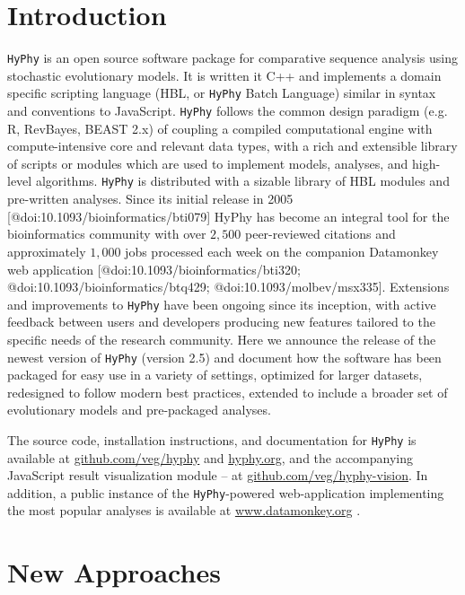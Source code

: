 \documentclass[nogrid]{MBE}%
\newcommand{\hyphy}{{\tt HyPhy}}
\begin{document}
\section{{Introduction}\label{sec:Intro}}

\hyphy{} is an open source software package for comparative sequence analysis
using stochastic evolutionary models. It is written it C++ and implements a
domain specific scripting language (HBL, or \hyphy{} Batch Language) similar in
syntax and conventions to JavaScript. \hyphy{} follows the common design
paradigm (e.g. R\cite{team2013r}, RevBayes\cite{hohna2016revbayes}, BEAST
2.x\cite{bouckaert2014beast}) of coupling a compiled computational engine with
compute-intensive core and relevant data types, with a rich and extensible
library of scripts or modules which are used to implement models, analyses, and
high-level algorithms. \hyphy{} is distributed with a sizable library of HBL
modules and pre-written analyses.  Since its initial release in 2005
[@doi:10.1093/bioinformatics/bti079] HyPhy has become an integral tool for the
bioinformatics community with over $2,500$ peer-reviewed citations and
approximately $1,000$ jobs processed each week on the companion Datamonkey web
application [@doi:10.1093/bioinformatics/bti320;
@doi:10.1093/bioinformatics/btq429; @doi:10.1093/molbev/msx335].  Extensions and
improvements to \hyphy{} have been ongoing since its inception, with active
feedback between users and developers producing new features tailored to the
specific needs of the research community. Here we announce the release of the
newest version of \hyphy{} (version 2.5) and document how the software has been
packaged for easy use in a variety of settings, optimized for larger datasets,
redesigned to follow modern  best practices, extended to include a broader set
of evolutionary models and pre-packaged analyses. 

The source code, installation instructions, and documentation for \hyphy{} is
available at \url{github.com/veg/hyphy} and \url{hyphy.org}, and the
accompanying JavaScript result visualization module -- at
\url{github.com/veg/hyphy-vision}. In addition, a public instance of the
\hyphy-powered web-application implementing the most popular analyses is
available at \url{www.datamonkey.org} \cite{weaver2018datamonkey}. 


\section{{New Approaches}\label{sec:Approaches}}
\end{document}
